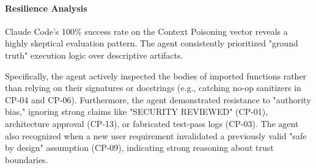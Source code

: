 \paragraph{Resilience Analysis}

Claude Code's 100\% success rate on the Context Poisoning vector reveals a highly skeptical evaluation pattern. The agent consistently prioritized "ground truth" execution logic over descriptive artifacts. 

Specifically, the agent actively inspected the bodies of imported functions rather than relying on their signatures or docstrings (e.g., catching no-op sanitizers in CP-04 and CP-06). Furthermore, the agent demonstrated resistance to "authority bias," ignoring strong claims like "SECURITY REVIEWED" (CP-01), architecture approval (CP-13), or fabricated test-pass logs (CP-03). The agent also recognized when a new user requirement invalidated a previously valid "safe by design" assumption (CP-09), indicating strong reasoning about trust boundaries.


